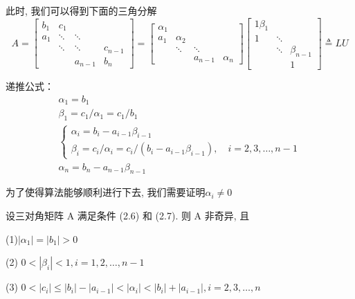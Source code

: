 \documentclass[12pt,a4paper]{article}
\begin{document}
此时, 我们可以得到下面的三角分解
\begin{equation}
A=\left[\begin{array}{cccc}{b_{1}} & {c_{1}} & {} & {} \\ {a_{1}} & {\ddots} & {\ddots} & {} \\ {} & {\ddots} & {\ddots} & {c_{n-1}} \\ {} & {} & {a_{n-1}} & {b_{n}}\end{array}\right]=\left[\begin{array}{cccc}{\alpha_{1}} & {} & {} & {} \\ {a_{1}} & {\alpha_{2}} & {} & {} \\ {} & {\ddots} & {\ddots} & {} \\ {} & {} & {a_{n-1}} & {\alpha_{n}}\end{array}\right]\left[\begin{array}{cccc}{1 \beta_{1}} \\ {1} & {\ddots} \\ {} & {\ddots} & {\beta_{n-1}} \\ {} & {} & {1}\end{array}\right] \triangleq L U
\end{equation}

递推公式：
\begin{equation}
\begin{array}{l}{\alpha_{1}=b_{1}} 
\\ {\beta_{1}=c_{1} / \alpha_{1}=c_{1} / b_{1}} 
\\ {\left\{\begin{array}{l}{\alpha_{i}=b_{i}-a_{i-1} \beta_{i-1}} \\ {\beta_{i}=c_{i} / \alpha_{i}=c_{i} /\left(b_{i}-a_{i-1} \beta_{i-1}\right), \quad i=2,3, \ldots, n-1} \end{array}\right.}\\ {\alpha_{n}=b_{n}-a_{n-1} \beta_{n-1}}\end{array}
\end{equation}

为了使得算法能够顺利进行下去, 我们需要证明$\alpha_{i} \neq 0$

\begin{framed}
	\begin{theorem}
		设三对角矩阵 A 满足条件 (2.6) 和 (2.7). 则 A 非奇异, 且
	    
	    (1)$\left|\alpha_{1}\right|=\left|b_{1}\right|>0$
	    
	    (2) $0<\left|\beta_{i}\right|<1, i=1,2, \ldots, n-1$
	    
	    (3)	$0<\left|c_{i}\right| \leq\left|b_{i}\right|-\left|a_{i-1}\right|<\left|\alpha_{i}\right|<\left|b_{i}\right|+\left|a_{i-1}\right|, i=2,3, \ldots, n$
	\end{theorem}
\end{framed}
\end{document}
